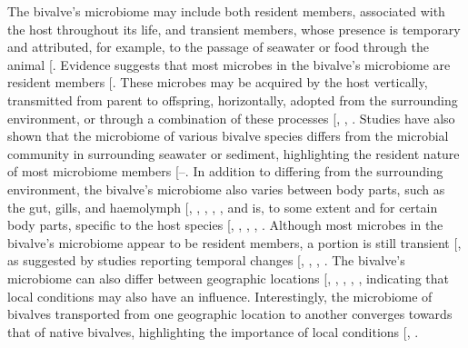 \documentclass[
  12 pt,
]{article}
\begin{document}
The bivalve's microbiome may include both resident members, associated with the host throughout its life, and transient members, whose presence is temporary and attributed, for example, to the passage of seawater or food through the animal {[}\citeproc{ref-Pierce2018}{6}{]}. Evidence suggests that most microbes in the bivalve's microbiome are resident members {[}\citeproc{ref-Unzueta-Martinez2022a}{7}{]}. These microbes may be acquired by the host vertically, transmitted from parent to offspring, horizontally, adopted from the surrounding environment, or through a combination of these processes {[}, , \citeproc{ref-Unzueta-Martinez2022}{9}{]}. Studies have also shown that the microbiome of various bivalve species differs from the microbial community in surrounding seawater or sediment, highlighting the resident nature of most microbiome members {[}--\citeproc{ref-Vezzulli2018}{15}{]}. In addition to differing from the surrounding environment, the bivalve's microbiome also varies between body parts, such as the gut, gills, and haemolymph {[}, , , , \citeproc{ref-Dube2019}{16}{]}, and is, to some extent and for certain body parts, specific to the host species {[}, , , , \citeproc{ref-Munoz-Martinez2026}{18}{]}. Although most microbes in the bivalve's microbiome appear to be resident members, a portion is still transient {[}\citeproc{ref-Unzueta-Martinez2022a}{7}{]}, as suggested by studies reporting temporal changes {[}, , , \citeproc{ref-Pierce2016}{20}{]}. The bivalve's microbiome can also differ between geographic locations {[}, , , , \citeproc{ref-Lokmer2016a}{22}{]}, indicating that local conditions may also have an influence. Interestingly, the microbiome of bivalves transported from one geographic location to another converges towards that of native bivalves, highlighting the importance of local conditions {[}, \citeproc{ref-Sun2025}{24}{]}.
\end{document}
